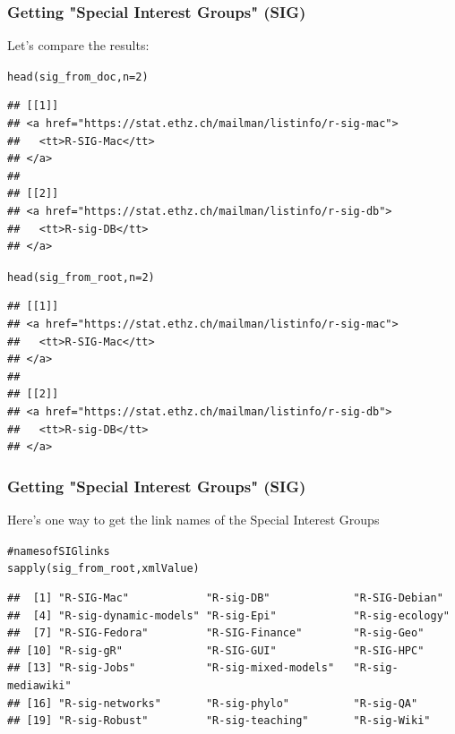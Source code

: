 \documentclass{beamer}\usepackage[]{graphicx}\usepackage[]{color}
\makeatletter
\newcommand{\hlnum}[1]{\textcolor[rgb]{0.063,0.58,0.627}{#1}}%
\newcommand{\hlcom}[1]{\textcolor[rgb]{0.588,0.588,0.588}{#1}}%
\newcommand{\hlstd}[1]{\textcolor[rgb]{0.196,0.196,0.196}{#1}}%
\newcommand{\hlkwc}[1]{\textcolor[rgb]{0,0.631,0.314}{#1}}%
\newcommand{\hlkwd}[1]{\textcolor[rgb]{0.78,0.227,0.412}{#1}}%
\newenvironment{kframe}{%
 \def\at@end@of@kframe{}%
 \ifinner\ifhmode%
  \def\at@end@of@kframe{\end{minipage}}%
  \begin{minipage}{\columnwidth}%
 \fi\fi%
 \def\FrameCommand##1{\hskip\@totalleftmargin \hskip-\fboxsep
 \colorbox{shadecolor}{##1}\hskip-\fboxsep
     \hskip-\linewidth \hskip-\@totalleftmargin \hskip\columnwidth}%
 \MakeFramed {\advance\hsize-\width
   \@totalleftmargin\z@ \linewidth\hsize
   \@setminipage}}%
 {\par\unskip\endMakeFramed%
 \at@end@of@kframe}
\newenvironment{knitrout}{}{} %
\makeatother
\begin{document}

\begin{frame}[fragile]
\frametitle{Getting "Special Interest Groups" (SIG)}

Let's compare the results:
\begin{knitrout}\tiny
{}\color{fgcolor}\begin{kframe}
\begin{alltt}
\hlkwd{head}\hlstd{(sig_from_doc,} \hlkwc{n} \hlstd{=} \hlnum{2}\hlstd{)}
\end{alltt}
\begin{verbatim}
## [[1]]
## <a href="https://stat.ethz.ch/mailman/listinfo/r-sig-mac">
##   <tt>R-SIG-Mac</tt>
## </a> 
## 
## [[2]]
## <a href="https://stat.ethz.ch/mailman/listinfo/r-sig-db">
##   <tt>R-sig-DB</tt>
## </a>
\end{verbatim}
\begin{alltt}
\hlkwd{head}\hlstd{(sig_from_root,} \hlkwc{n} \hlstd{=} \hlnum{2}\hlstd{)}
\end{alltt}
\begin{verbatim}
## [[1]]
## <a href="https://stat.ethz.ch/mailman/listinfo/r-sig-mac">
##   <tt>R-SIG-Mac</tt>
## </a> 
## 
## [[2]]
## <a href="https://stat.ethz.ch/mailman/listinfo/r-sig-db">
##   <tt>R-sig-DB</tt>
## </a>
\end{verbatim}
\end{kframe}
\end{knitrout}

\end{frame}


\begin{frame}[fragile]
\frametitle{Getting "Special Interest Groups" (SIG)}

Here's one way to get the link names of the Special Interest Groups 
\begin{knitrout}\tiny
{}\color{fgcolor}\begin{kframe}
\begin{alltt}
\hlcom{# names of SIG links}
\hlkwd{sapply}\hlstd{(sig_from_root, xmlValue)}
\end{alltt}
\begin{verbatim}
##  [1] "R-SIG-Mac"            "R-sig-DB"             "R-SIG-Debian"        
##  [4] "R-sig-dynamic-models" "R-sig-Epi"            "R-sig-ecology"       
##  [7] "R-SIG-Fedora"         "R-SIG-Finance"        "R-sig-Geo"           
## [10] "R-sig-gR"             "R-SIG-GUI"            "R-SIG-HPC"           
## [13] "R-sig-Jobs"           "R-sig-mixed-models"   "R-sig-mediawiki"     
## [16] "R-sig-networks"       "R-sig-phylo"          "R-sig-QA"            
## [19] "R-sig-Robust"         "R-sig-teaching"       "R-sig-Wiki"
\end{verbatim}
\end{kframe}
\end{knitrout}

\end{frame}
\end{document}
